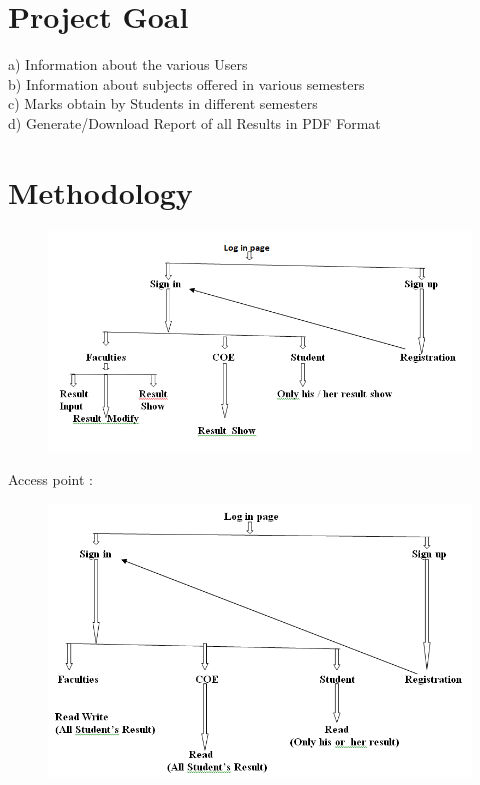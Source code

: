 \documentclass{article}
\begin{document}
\begin{titlepage}
\section{Project Goal}\label{sec intro}
a)	Information about the various Users \\
b)	Information about subjects offered in various semesters \\
c)	Marks obtain by Students in different semesters\\
d)	Generate/Download Report of all Results in PDF Format\\

\vspace{5cm}


\section{Methodology}\label{oject}

\begin{figure}[h!]
\centering
\includegraphics[width=.9\textwidth]{Metho.png}

\end{figure}

\label{oject}
Access point :

\begin{figure}[h!]
\centering
\includegraphics[width=.9\textwidth]{Access.png}


\end{figure}
\end{titlepage}
\end{document}
